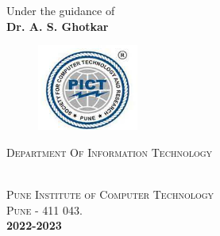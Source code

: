 \documentclass[12pt,a4paper]{report}     %
\begin{document}
	\begin{center}
	    {Under the guidance of }\\
	    {\textbf{Dr. A. S. Ghotkar}}  %
	\end{center}

		\vspace{0.075in}

	\begin{center}
	  \begin{figure}[h]
			\centering
			\includegraphics[scale=1.5]{pict_logo.png}
		\end{figure}
		\vspace{0.1cm}
	  \begin{large}\textsc {Department Of Information Technology} \end{large}\\
	  \textsc{Pune Institute of Computer Technology}\\
	  \textsc{Pune - 411 043.}\\
	      \textbf{2022-2023}
	\end{center}

\newpage
\pagestyle{plain}
\pagestyle{empty}
\pagestyle{fancy}							%
\renewcommand{\headrulewidth}{0pt}

		
\end{document}
